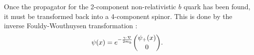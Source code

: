 Once the propagator for the 2-component non-relativistic $b$ quark has been found, it must be transformed back into a 4-component spinor. This is done by the inverse Fouldy-Wouthuysen transformation \cite{PhysRev.78.29}:
\begin{align}
  \psi(x) = e^{-{{\bf{\gamma}}\cdot{\bf{\nabla}}\over 2m_b}}\binom{\psi_+(x)}{0}.
  \label{eq:FoldyWoldy}
\end{align}
